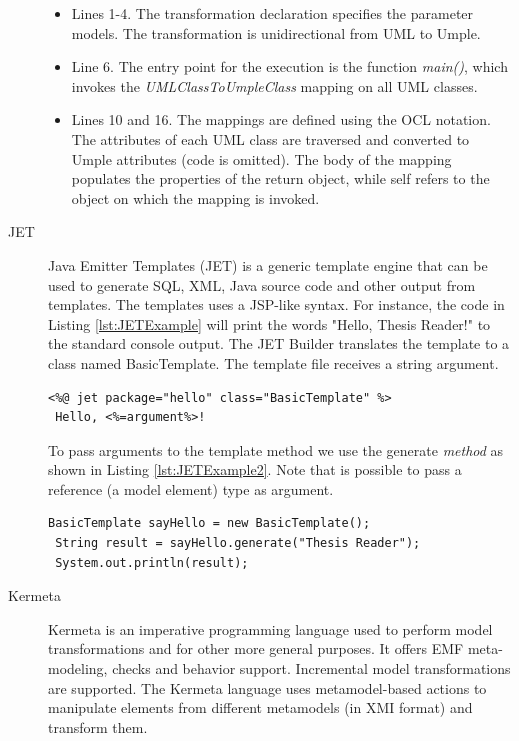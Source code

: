 \begin{description}
\begin{itemize}
\item Lines 1-4. The transformation declaration specifies the parameter models. The transformation is unidirectional from UML to Umple.
\item Line 6. The entry point for the execution is the function \textit{main()}, which invokes the \textit{UMLClassToUmpleClass} mapping on all UML classes. 
\item Lines 10 and 16. The mappings are defined using the OCL notation. The attributes of each UML class are traversed and converted to Umple attributes (code is omitted). The body of the mapping populates the properties of the return object, while self refers to the object on which the mapping is invoked.
\end{itemize}
\item[JET]
Java Emitter Templates (JET) is a generic template engine that can be used to generate SQL, XML, Java source code and other output from templates. The templates uses a JSP-like syntax.
For instance, the code in Listing \ref{lst:JETExample} will print the words "Hello, Thesis Reader!" to the standard console output. The JET Builder translates the template to a class named BasicTemplate. The template file receives a string argument.

\begin{lstlisting}[style=java,label=lst:JETExample, caption=A basic JET Template]
<%@ jet package="hello" class="BasicTemplate" %>
 Hello, <%=argument%>!
\end{lstlisting}

To pass arguments to the template method we use the generate \textit{method} as shown in Listing \ref{lst:JETExample2}. Note that is possible to pass a reference (a model element) type as argument. 

\begin{lstlisting}[style=java,label=lst:JETExample2, caption=Instantiating the BasicTemplate class]
 BasicTemplate sayHello = new BasicTemplate();
 String result = sayHello.generate("Thesis Reader");
 System.out.println(result);
\end{lstlisting}

\item[Kermeta]
Kermeta \cite{kermetaMain} is an imperative programming language used to perform model transformations and for other more general purposes. It offers EMF meta-modeling, checks and behavior support. Incremental model transformations are supported. The Kermeta language uses metamodel-based actions to manipulate elements from different metamodels (in XMI format) and transform them. 


\end{description}

